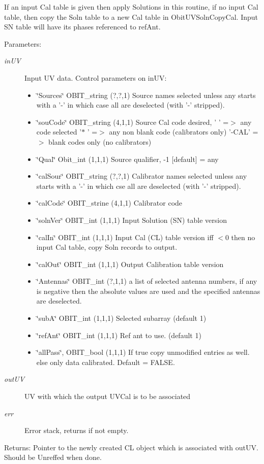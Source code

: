 If an input Cal table is given then apply Solutions in this routine, if no input Cal table, then copy the Soln table to a new Cal table in Obit\-UVSoln\-Copy\-Cal. Input SN table will have its phases referenced to ref\-Ant. \begin{Desc}
\item[Parameters:]
\begin{description}
\item[{\em in\-UV}]Input UV data. Control parameters on in\-UV: \begin{itemize}
\item \char`\"{}Sources\char`\"{} OBIT\_\-string (?,?,1) Source names selected unless any starts with a '-' in which case all are deselected (with '-' stripped). \item \char`\"{}sou\-Code\char`\"{} OBIT\_\-string (4,1,1) Source Cal code desired, ' ' =$>$ any code selected '$\ast$ ' =$>$ any non blank code (calibrators only) '-CAL' =$>$ blank codes only (no calibrators) \item \char`\"{}Qual\char`\"{} Obit\_\-int (1,1,1) Source qualifier, -1 [default] = any \item \char`\"{}cal\-Sour\char`\"{} OBIT\_\-string (?,?,1) Calibrator names selected unless any starts with a '-' in which cse all are deselected (with '-' stripped). \item \char`\"{}cal\-Code\char`\"{} OBIT\_\-strine (4,1,1) Calibrator code \item \char`\"{}soln\-Ver\char`\"{} OBIT\_\-int (1,1,1) Input Solution (SN) table version \item \char`\"{}cal\-In\char`\"{} OBIT\_\-int (1,1,1) Input Cal (CL) table version iff $<$0 then no input Cal table, copy Soln records to output. \item \char`\"{}cal\-Out\char`\"{} OBIT\_\-int (1,1,1) Output Calibration table version \item \char`\"{}Antennas\char`\"{} OBIT\_\-int (?,1,1) a list of selected antenna numbers, if any is negative then the absolute values are used and the specified antennas are deselected. \item \char`\"{}sub\-A\char`\"{} OBIT\_\-int (1,1,1) Selected subarray (default 1) \item \char`\"{}ref\-Ant\char`\"{} OBIT\_\-int (1,1,1) Ref ant to use. (default 1) \item \char`\"{}all\-Pass\char`\"{}, OBIT\_\-bool (1,1,1) If true copy unmodified entries as well. else only data calibrated. Default = FALSE. \end{itemize}
\item[{\em out\-UV}]UV with which the output UVCal is to be associated \item[{\em err}]Error stack, returns if not empty. \end{description}
\end{Desc}
\begin{Desc}
\item[Returns:]Pointer to the newly created CL object which is associated with out\-UV. Should be Unreffed when done. \end{Desc}
